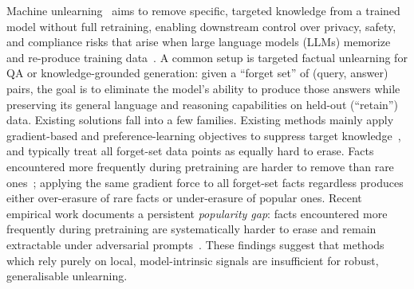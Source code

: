 Machine unlearning~\cite{cao2015towards, bourtoule2021machine} aims to remove specific, targeted knowledge from a trained model without full retraining, enabling downstream control over privacy, safety, and compliance risks that arise when large language models (LLMs) memorize and re-produce training data~\cite{carlini2021extracting, tirumala2022memorization}. A common setup is targeted factual unlearning for QA or knowledge-grounded generation: given a ``forget set'' of (query, answer) pairs, the goal is to eliminate the model’s ability to produce those answers while preserving its general language and reasoning capabilities on held-out (``retain'') data. Existing solutions fall into a few families.
Existing methods mainly apply gradient-based and preference-learning objectives to suppress target knowledge~\cite{jang2022knowledge, liu2022continual, zhang2024negative, wang2025rethinking}, and typically treat all forget-set data points as equally hard to erase. Facts encountered more frequently during pretraining are harder to remove than rare ones~\cite{kandpal2023large, merullo2025linear}; applying the same gradient force to all forget-set facts regardless produces either over-erasure of rare facts or under-erasure of popular ones. %
Recent empirical work documents a persistent \emph{popularity gap}: facts encountered more frequently during pretraining are systematically harder to erase and remain extractable under adversarial prompts~\cite{krishnannot, anna2026anatomy}. These findings suggest that methods which rely purely on local, model-intrinsic signals are insufficient for robust, generalisable unlearning.


